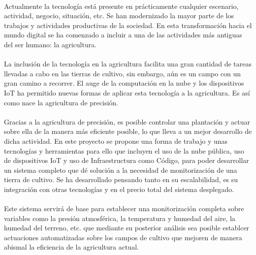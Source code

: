 \documentclass[../../memoria.tex]{subfiles}
\begin{document}
\paragraph{}
Actualmente la tecnología está presente en prácticamente cualquier escenario, actividad, negocio, situación, etc. Se han modernizado la mayor parte de los trabajos y actividades productivas de la sociedad. En esta transformación hacia el mundo digital se ha comenzado a incluir a una de las actividades más antiguas del ser humano: la agricultura.

\paragraph{}
La inclusión de la tecnología en la agricultura facilita una gran cantidad de tareas llevadas a cabo en las tierras de cultivo, sin embargo, aún es un campo con un gran camino a recorrer. El auge de la computación en la nube y los dispositivos IoT ha permitido nuevas formas de aplicar esta tecnología a la agricultura. Es así como nace la agricultura de precisión.

\paragraph{}
Gracias a la agricultura de precisión, es posible controlar una plantación y actuar sobre ella de la manera más eficiente posible, lo que lleva a un mejor desarrollo de dicha actividad. En este proyecto se propone una forma de trabajo y unas tecnologías y herramientas para ello que incluyen el uso de la nube pública, uso de dispositivos IoT y uso de Infraestructura como Código, para poder desarrollar un sistema completo que dé solución a la necesidad de monitorización de una tierra de cultivo. Se ha desarrollado pensando tanto en su escalabilidad, es su integración con otras tecnologías y en el precio total del sistema desplegado.

\paragraph{}
Este sistema servirá de base para establecer una monitorización completa sobre variables como la presión atmosférica, la temperatura y humedad del aire, la humedad del terreno, etc. que mediante su posterior análisis sea posible establcer actuaciones automatizadas sobre los campos de cultivo que mejoren de manera abismal la eficiencia de la agricultura actual.
\end{document}
